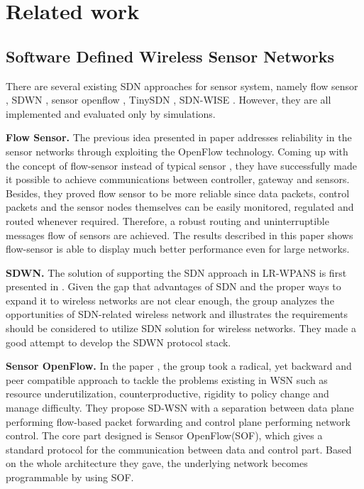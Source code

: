 \section{Related work}

\subsection{Software Defined Wireless Sensor Networks}


There are several existing SDN approaches for sensor system, 
namely flow sensor \cite{mahmud2011exploitation}, SDWN \cite{costanzo2012software},
sensor openflow \cite{luo2012sensor}, TinySDN \cite{de2015tinysdn}, SDN-WISE \cite{galluccio2015sdn}.
However, they are all implemented and evaluated only by simulations. 

\textbf{Flow Sensor.}
The previous idea presented in paper \cite{mahmud2011exploitation} addresses 
reliability in the sensor networks through exploiting the OpenFlow technology\cite{Mckeown2008OpenFlow}. 
Coming up with the concept of flow-sensor instead of typical sensor \cite{Liu2015Thermoresistive}, 
they have successfully made it possible to achieve communications between controller, 
gateway and sensors. Besides, they proved flow sensor to be more 
reliable since data packets, control packets and the sensor nodes 
themselves can be easily monitored, regulated and routed whenever 
required. Therefore, a robust routing and uninterruptible messages 
flow of sensors are achieved. The results described in this paper 
shows flow-sensor is able to display much better performance even for large networks.

\textbf{SDWN.}
The solution of supporting the SDN approach in LR-WPANS is first presented in \cite{costanzo2012software}. 
Given the gap that advantages of SDN and the proper ways to expand it to wireless networks are not clear enough, 
the group analyzes the opportunities of SDN-related wireless network and illustrates 
the requirements should be considered to utilize SDN solution for wireless networks. 
They made a good attempt to develop the SDWN protocol stack.

\textbf{Sensor OpenFlow.}
In the paper \cite{luo2012sensor}, the group took a radical, yet backward 
and peer compatible approach to tackle the problems existing in WSN 
such as resource underutilization, counterproductive, rigidity to policy 
change and manage difficulty. They propose SD-WSN with a separation between 
data plane performing flow-based packet forwarding and control plane performing network control. 
The core part designed is Sensor OpenFlow(SOF), which gives a standard protocol for the communication 
between data and control part. Based on the whole architecture they gave, 
the underlying network becomes programmable by using SOF.

